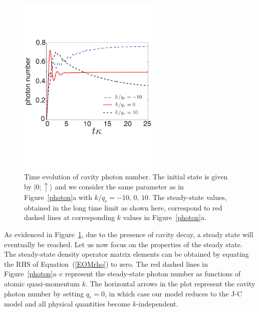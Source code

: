 \documentclass[atoms,article,accept,moreauthors,pdftex,12pt,a4paper]{mdpi}
\begin{document}
\begin{figure}[H]
\centering
\includegraphics[width=0.6\textwidth]{photon_evolution}\vspace{6pt}
\caption{Time evolution of cavity photon number. The initial state is given by $|0;\uparrow\rangle$ and we consider the same parameter as in Figure~\ref{photon}a with $k/q_r=-10,\,0,\,10$. The steady-state values, obtained in the long time limit as shown here, correspond to red dashed lines at corresponding $k$ values in Figure~\ref{photon}a.}\label{evo}
\end{figure}

As evidenced in Figure~\ref{evo}, due to the presence of cavity decay, a steady state will eventually be reached. Let us now focus on the properties of the steady state. The steady-state density operator matrix elements can be obtained by equating the RHS of Equation~(\ref{EOMrho}) to zero. The red dashed lines in Figure~\ref{photon}a--c represent the steady-state photon number as functions of atomic quasi-momentum $k$. The horizontal arrows in the plot represent the cavity photon number by setting $q_r=0$, in which case our model reduces to the J-C model and all physical quantities become $k$-independent.
\end{document}
